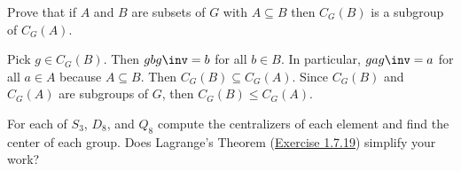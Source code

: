 \begin{exercise} \label{ex2.2.3}
    Prove that if $A$ and $B$ are subsets of $G$ with $A \subseteq B$ then $C_G(B)$ is a subgroup of $C_G(A)$.
\end{exercise}

\begin{sol}
    Pick $g \in C_G(B)$. Then $gbg\inv = b$ for all $b \in B$. In particular, $gag\inv = a$ for all $a \in A$ because $A \subseteq B$. Then $C_G(B) \subseteq C_G(A)$. Since $C_G(B)$ and $C_G(A)$ are subgroups of $G$, then $C_G(B) \leq C_G(A)$.
\end{sol}

\begin{specialexercise} \label{ex2.2.4}
    For each of $S_3$, $D_8$, and $Q_8$ compute the centralizers of each element and find the center of each group. Does Lagrange's Theorem (\hyperref[ex1.7.19]{Exercise 1.7.19}) simplify your work?
\end{specialexercise}

